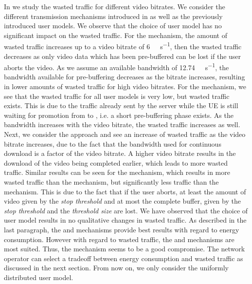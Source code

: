 In  we study the wasted traffic for different video bitrates.
We consider the different transmission mechanisms introduced in  as well as the previously introduced user models.
We observe that the choice of user model has no significant impact on the wasted traffic.
For the \download mechanism, the amount of wasted traffic increases up to a video bitrate of \SI{6}{\mega\bit\per\second}, then the wasted traffic decreases as only video data which has been pre-buffered can be lost if the user aborts the video.
As we assume an available bandwidth of \SI{12.74}{\mega\bit\per\second}, the bandwidth available for pre-buffering decreases as the bitrate increases, resulting in lower amounts of wasted traffic for high video bitrates.
For the \live mechanism, we see that the wasted traffic for all user models is very low, but wasted traffic exists.
This is due to the traffic already sent by the server while the \gls{UE} is still waiting for promotion from \rrcidle to \rrcconnected, i.e. a short pre-buffering phase exists.
As the bandwidth increases with the video bitrate, the wasted traffic increases as well.
Next, we consider the \serviceprovisioning approach and see an increase of wasted traffic as the video bitrate increases, due to the fact that the bandwidth used for continuous download is a factor of the video bitrate.
A higher video bitrate results in the download of the video being completed earlier, which leads to more wasted traffic.
Similar results can be seen for the \streaming mechanism, which results in more wasted traffic than the \live mechanism, but significantly less traffic than the \serviceprovisioning mechanism.
This is due to the fact that if the user aborts, at least the amount of video given by the \emph{stop threshold} \bufferlower and at most the complete buffer, given by the \emph{stop threshold} and the \emph{threshold size} are lost.
We have observed that the choice of user model results in no qualitative changes in wasted traffic.
As described in the last paragraph, the \download and \streaming mechanisms provide best results with regard to energy consumption.
However with regard to wasted traffic, the \live and \streaming mechanisms are most suited.
Thus, the \streaming mechanism seems to be a good compromise.
The network operator can select a tradeoff between energy consumption and wasted traffic as discussed in the next section.
From now on, we only consider the uniformly distributed user model.

